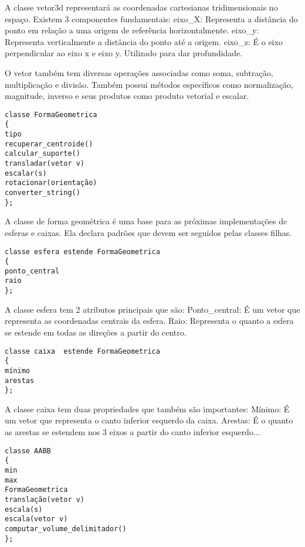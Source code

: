 A classe vetor3d representará as coordenadas cartesianas tridimensionais no
espaço. Existem 3 componentes fundamentais:
eixo_X: Representa a distância do ponto em relação a uma origem de referência horizontalmente.
eixo_y: Representa verticalmente a distância do ponto até a origem.
eixo_z: É o eixo perpendicular ao eixo x e eixo y. Utilizado para dar profundidade.

O vetor também tem diversas operações associadas como soma, subtração,
multiplicação e divisão. Também possui métodos específicos como normalização,
magnitude, inverso e seus produtos como produto vetorial e escalar.

\begin{lstlisting}[frame=single,caption=Código de exemplo\label{codigo1}]
classe FormaGeometrica
{
tipo
recuperar_centroide()
calcular_suporte()
transladar(vetor v)
escalar(s)
rotacionar(orientação)
converter_string()
};
\end{lstlisting}

A classe de forma geométrica é uma base para as próximas implementações de
esferas e caixas.
Ela declara padrões que devem ser seguidos pelas classes filhas.

\begin{lstlisting}[frame=single,caption=Código de exemplo\label{codigo1}]
classe esfera estende FormaGeometrica
{
ponto_central
raio
};
\end{lstlisting}


A classe esfera tem 2 atributos principais que são:
Ponto_central: É um vetor que representa as coordenadas centrais da esfera.
Raio: Representa o quanto a esfera se estende em todas as direções a partir do
centro.

\begin{lstlisting}[frame=single,caption=Código de exemplo\label{codigo1}]
classe caixa  estende FormaGeometrica
{
mínimo
arestas
};
\end{lstlisting}

A classe caixa tem duas propriedades que também são importantes:
Mínimo: É um vetor que representa o canto inferior esquerdo da caixa.
Arestas: É o quanto as arestas se estendem nos 3 eixos a partir do canto
inferior esquerdo...

\begin{lstlisting}[frame=single,caption=Código de exemplo\label{codigo1}]
classe AABB
{
min
max
FormaGeometrica
translação(vetor v)
escala(s)
escala(vetor v)
computar_volume_delimitador()
};
\end{lstlisting}

